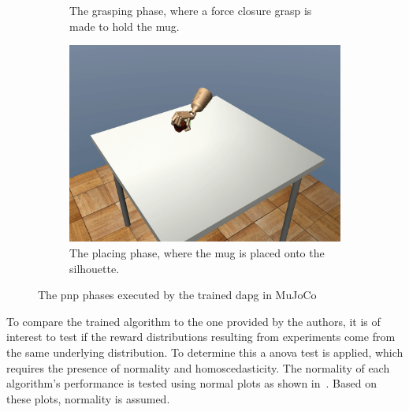 \begin{figure}[!h]
\begin{subfigure}[b]{0.32\textwidth}
		\caption{The grasping phase, where a force closure grasp is made to hold the mug.}
		\label{fig:ai-frame-2}
	\end{subfigure}
	\hfill
	\begin{subfigure}[b]{0.32\textwidth}
		\centering
		\includegraphics[width=\textwidth]{chapters/3-in-hand-manipulation/fig/frame_44.png}
		\caption{The placing phase, where the mug is placed onto the silhouette.}
		\label{fig:ai-frame-3}
	\end{subfigure}
		\caption{The \gls{pnp} phases executed by the trained \gls{dapg} in MuJoCo}
		\label{fig:ai-frames}
\end{figure}

To compare the trained algorithm to the one provided by the authors, it is of interest to test if the reward distributions resulting from experiments come from the same underlying distribution. To determine this a \gls{anova} test is applied, which requires the presence of normality and homoscedasticity. The normality of each algorithm's performance is tested using normal plots as shown in~. Based on these plots, normality is assumed.

